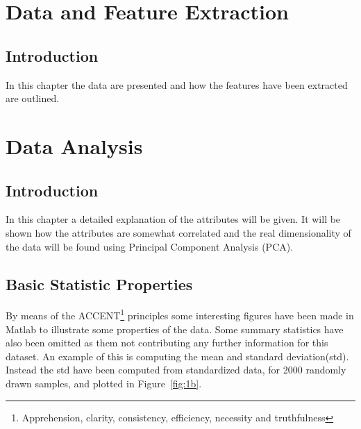 \documentclass[10pt,a4paper]{report}
\newcommand{\texdir}{tex/} %
\begin{document}
\inserttitlepage

\inserttoc



\chapter{Data and Feature Extraction}

\section{Introduction}
In this chapter the data are presented and how the features have been extracted are outlined.

 

\chapter{Data Analysis}

\section{Introduction}
In this chapter a detailed explanation of the attributes will be given. It will be shown how the attributes are somewhat correlated and the real dimensionality of the data will be found using Principal Component Analysis (PCA). 

\section{Basic Statistic Properties}
By means of the ACCENT\footnote{Apprehension, clarity, consistency, efficiency, necessity and truthfulness} principles some interesting figures have been made in Matlab to illustrate some properties of the data. Some summary statistics have also been omitted as them not contributing any further information for this dataset. An example of this is computing the mean and standard deviation(std). Instead the std have been computed from standardized data, for 2000 randomly drawn samples, and plotted in Figure~\ref{fig:1b}. 
 
\end{document}
